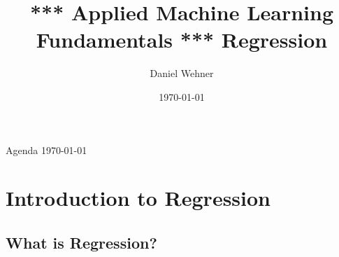 


\title[Regression]{*** Applied Machine Learning Fundamentals *** Regression}
\author{Daniel Wehner}
\date{\today}




\maketitlepage


\begin{frame}{Agenda \today}
	\begin{multicols}{2}
		\tableofcontents
	\end{multicols}
\end{frame}


\section{Introduction to Regression}

\subsection{What is Regression?}

